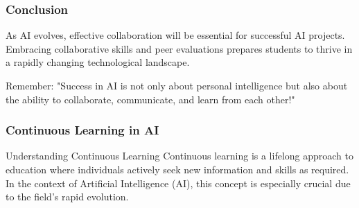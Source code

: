 \documentclass[aspectratio=169]{beamer}
\begin{document}
\begin{frame}[fragile]
    \frametitle{Conclusion}
    As AI evolves, effective collaboration will be essential for successful AI projects. Embracing collaborative skills and peer evaluations prepares students to thrive in a rapidly changing technological landscape.
    \vspace{1em}
    \begin{block}{Remember:}
        "Success in AI is not only about personal intelligence but also about the ability to collaborate, communicate, and learn from each other!"
    \end{block}
\end{frame}

\begin{frame}[fragile]
    \frametitle{Continuous Learning in AI}
    \begin{block}{Understanding Continuous Learning}
        Continuous learning is a lifelong approach to education where individuals actively seek new information and skills as required. 
        In the context of Artificial Intelligence (AI), this concept is especially crucial due to the field’s rapid evolution.
    \end{block}
\end{frame}
\end{document}
